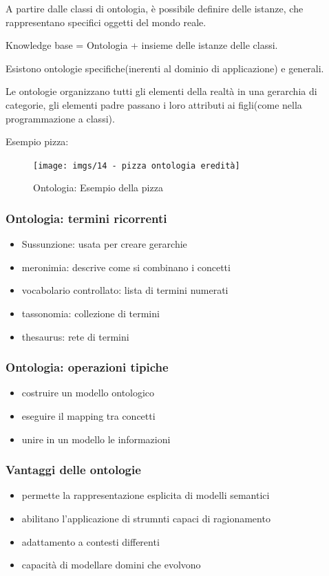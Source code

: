 A partire dalle classi di ontologia, è possibile definire delle istanze, che rappresentano specifici oggetti
del mondo reale.

Knowledge base = Ontologia + insieme delle istanze delle classi.

Esistono ontologie specifiche(inerenti al dominio di applicazione) e generali.

Le ontologie organizzano tutti gli elementi della realtà in una gerarchia di categorie,
gli elementi padre passano i loro attributi ai figli(come nella programmazione a classi).

Esempio pizza:
\begin{figure}[H]
    \centering
    \texttt{[image: imgs/14 - pizza ontologia eredità]}
    \caption{Ontologia: Esempio della pizza}
    \label{fig:pizza}
\end{figure}

\subsubsection{Ontologia: termini ricorrenti}
\begin{itemize}
    \item Sussunzione: usata per creare gerarchie
    \item meronimia: descrive come si combinano i concetti
    \item vocabolario controllato: lista di termini numerati
    \item tassonomia: collezione di termini
    \item thesaurus: rete di termini
\end{itemize}
\subsubsection{Ontologia: operazioni tipiche}
\begin{itemize}
    \item costruire un modello ontologico
    \item eseguire il mapping tra concetti
    \item unire in un modello le informazioni
\end{itemize}
\subsubsection{Vantaggi delle ontologie}
\begin{itemize}
    \item permette la rappresentazione esplicita di modelli semantici
    \item abilitano l'applicazione di strumnti capaci di ragionamento
    \item adattamento a contesti differenti
    \item capacità di modellare domini che evolvono
\end{itemize}

